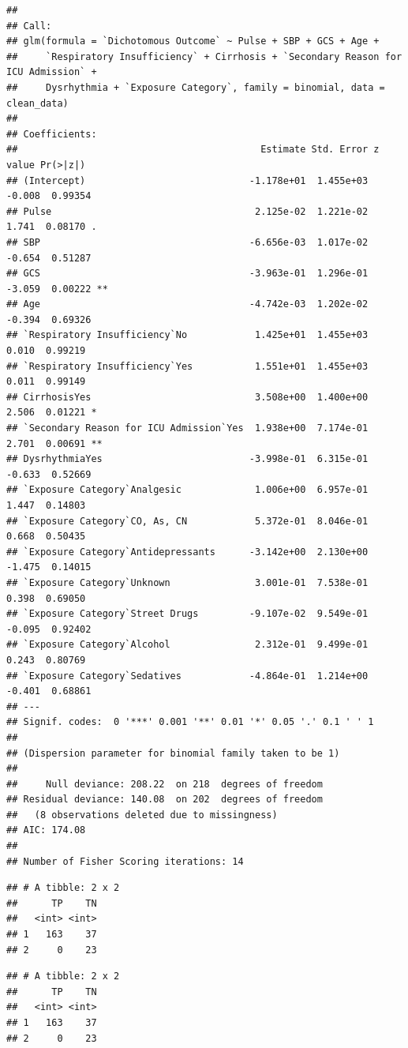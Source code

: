 \documentclass[
]{article}
\begin{document}
\begin{verbatim}
## 
## Call:
## glm(formula = `Dichotomous Outcome` ~ Pulse + SBP + GCS + Age + 
##     `Respiratory Insufficiency` + Cirrhosis + `Secondary Reason for ICU Admission` + 
##     Dysrhythmia + `Exposure Category`, family = binomial, data = clean_data)
## 
## Coefficients:
##                                           Estimate Std. Error z value Pr(>|z|)   
## (Intercept)                             -1.178e+01  1.455e+03  -0.008  0.99354   
## Pulse                                    2.125e-02  1.221e-02   1.741  0.08170 . 
## SBP                                     -6.656e-03  1.017e-02  -0.654  0.51287   
## GCS                                     -3.963e-01  1.296e-01  -3.059  0.00222 **
## Age                                     -4.742e-03  1.202e-02  -0.394  0.69326   
## `Respiratory Insufficiency`No            1.425e+01  1.455e+03   0.010  0.99219   
## `Respiratory Insufficiency`Yes           1.551e+01  1.455e+03   0.011  0.99149   
## CirrhosisYes                             3.508e+00  1.400e+00   2.506  0.01221 * 
## `Secondary Reason for ICU Admission`Yes  1.938e+00  7.174e-01   2.701  0.00691 **
## DysrhythmiaYes                          -3.998e-01  6.315e-01  -0.633  0.52669   
## `Exposure Category`Analgesic             1.006e+00  6.957e-01   1.447  0.14803   
## `Exposure Category`CO, As, CN            5.372e-01  8.046e-01   0.668  0.50435   
## `Exposure Category`Antidepressants      -3.142e+00  2.130e+00  -1.475  0.14015   
## `Exposure Category`Unknown               3.001e-01  7.538e-01   0.398  0.69050   
## `Exposure Category`Street Drugs         -9.107e-02  9.549e-01  -0.095  0.92402   
## `Exposure Category`Alcohol               2.312e-01  9.499e-01   0.243  0.80769   
## `Exposure Category`Sedatives            -4.864e-01  1.214e+00  -0.401  0.68861   
## ---
## Signif. codes:  0 '***' 0.001 '**' 0.01 '*' 0.05 '.' 0.1 ' ' 1
## 
## (Dispersion parameter for binomial family taken to be 1)
## 
##     Null deviance: 208.22  on 218  degrees of freedom
## Residual deviance: 140.08  on 202  degrees of freedom
##   (8 observations deleted due to missingness)
## AIC: 174.08
## 
## Number of Fisher Scoring iterations: 14
\end{verbatim}

\begin{verbatim}
## # A tibble: 2 x 2
##      TP    TN
##   <int> <int>
## 1   163    37
## 2     0    23
\end{verbatim}

\begin{verbatim}
## # A tibble: 2 x 2
##      TP    TN
##   <int> <int>
## 1   163    37
## 2     0    23
\end{verbatim}
\end{document}
